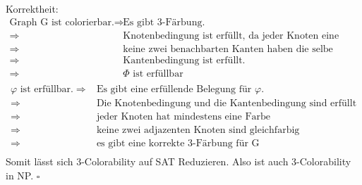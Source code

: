 \documentclass{article}
\begin{document}
	Korrektheit:\\
	\begin{align*}
		\text{Graph G ist colorierbar.} \Rightarrow& \text{Es gibt 3-Färbung.}\\
		\Rightarrow& \text{Knotenbedingung ist erfüllt, da jeder Knoten eine Farbe hat.}\\
		\Rightarrow& \text{keine zwei benachbarten Kanten haben die selbe Farbe.}\\
		\Rightarrow& \text{Kantenbedingung ist erfüllt.}\\		
		\Rightarrow& \varPhi \text{ ist erfüllbar}\\
	\end{align*}
	\begin{align*}
	\varphi \text{ ist erfüllbar.} \Rightarrow& \text{Es gibt eine erfüllende Belegung für }\varphi.\\
	\Rightarrow& \text{Die Knotenbedingung und die Kantenbedingung sind erfüllt}\\
	\Rightarrow& \text{jeder Knoten hat mindestens eine Farbe}\\
	\Rightarrow& \text{keine zwei adjazenten Knoten sind gleichfarbig}\\		
	\Rightarrow& \text{es gibt eine korrekte 3-Färbung für G}\\
	\end{align*}
	Somit lässt sich 3-Colorability auf SAT Reduzieren. Also ist auch 3-Colorability in NP.
	$\square$
\end{document}
